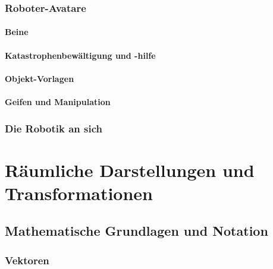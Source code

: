 \documentclass[a4paper, 11pt, accentcolor = tud3b]{tudreport}
\begin{document}
			\subsection{Roboter-Avatare} %

				\subsubsection{Beine} %

				\subsubsection{Katastrophenbewältigung und -hilfe} %

				\subsubsection{Objekt-Vorlagen} %

				\subsubsection{Geifen und Manipulation} %

			\subsection{Die Robotik an sich} %

	\chapter{Räumliche Darstellungen und Transformationen} %

		\section{Mathematische Grundlagen und Notation} %

			\subsection{Vektoren} %
\end{document}
